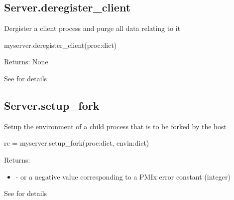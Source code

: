 \subsection{Server.deregister_client}

\summary
Dergister a client process and purge all data relating to it


\format

\pyspecificstart
\begin{codepar}
myserver.deregister_client(proc:dict)
\end{codepar}
\pyspecificend


\begin{arglist}
\end{arglist}

Returns: None


See  for details


\subsection{Server.setup_fork}

\summary
Setup the environment of a child process that is to be forked
by the host

\format

\pyspecificstart
\begin{codepar}
rc = myserver.setup_fork(proc:dict, envin:dict)
\end{codepar}
\pyspecificend


\begin{arglist}
\end{arglist}

Returns:

\begin{itemize}
    \item {} -  or a negative value corresponding to a PMIx error constant (integer)
\end{itemize}


See  for details


